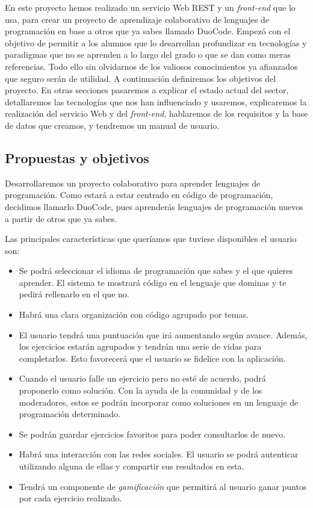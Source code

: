 En este proyecto hemos realizado un servicio Web REST y un \emph{front-end} que lo usa, para crear un proyecto de aprendizaje colaborativo de lenguajes de programación en base a otros que ya sabes llamado DuoCode. Empezó con el objetivo de permitir a los alumnos que lo desarrollan profundizar en tecnologías y paradigmas que no se aprenden a lo largo del grado o que se dan como meras referencias. Todo ello sin olvidarnos de los valiosos conocimientos ya afianzados que seguro serán de utilidad. A continuación definiremos los objetivos del proyecto. En otras secciones pasaremos a explicar el estado actual del sector, detallaremos las tecnologías que nos han influenciado y usaremos, explicaremos la realización del servicio Web y del \emph{front-end}, hablaremos de los requisitos y la base de datos que creamos, y tendremos un manual de usuario.

\subsection{Propuestas y objetivos\label{subsec:introduction}}

Desarrollaremos un proyecto colaborativo para aprender lenguajes de programación. Como estará a estar centrado en código de programación, decidimos llamarlo DuoCode, pues aprenderás lenguajes de programación nuevos a partir de otros que ya sabes. 
\vspace{1em}

Las principales características que queríamos que tuviese disponibles el usuario son:

\begin{itemize}
\item
Se podrá seleccionar el idioma de programación que sabes y el que quieres aprender. El sistema te mostrará código en el lenguaje que dominas y te pedirá rellenarlo en el que no.

\item
Habrá una clara organización con código agrupado por temas.

\item
El usuario tendrá una puntuación que irá aumentando según avance. Además, los ejercicios estarán agrupados y tendrán una serie de vidas para completarlos. Esto favorecerá  que el usuario se fidelice con la aplicación.

\item
Cuando el usuario falle un ejercicio pero no esté de acuerdo, podrá proponerlo como solución. Con la ayuda de la comunidad y de los moderadores, estos se podrán incorporar como soluciones en un lenguaje de programación determinado.

\item
Se podrán guardar ejercicios favoritos para poder consultarlos de nuevo.

\item
Habrá una interacción con las redes sociales. El usuario se podrá autenticar utilizando alguna de ellas y compartir sus resultados en esta.

\item
Tendrá un componente de \emph{gamificación} que permitirá al usuario ganar puntos por cada ejercicio realizado.
\end{itemize}

